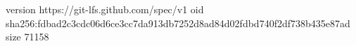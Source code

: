 version https://git-lfs.github.com/spec/v1
oid sha256:fdbad2c3cdc06d6ce3cc7da913db7252d8ad84d02fdbd740f2df738b435e87ad
size 71158
